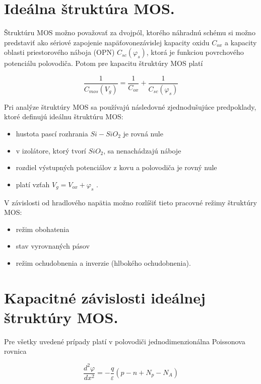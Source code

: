\section{Ideálna štruktúra MOS.}  

Štruktúru MOS možno považovať za dvojpól, ktorého náhradnú schému si
možno predstaviť ako sériové zapojenie napäťovonezávislej kapacity
oxidu $C_{ox}$ a kapacity oblasti priestorového náboja (OPN)
$C_{sc}(\varphi_{s})$, ktorá je funkciou povrchového potenciálu
polovodiča. Potom pre kapacitu štruktúry MOS platí \cite{I.1}

\begin{equation}\label{eq:1.1}
\frac{1}{C_{mos}(V_g)} = \frac{1}{C_{ox}} + \frac{1}{C_{sc}(\varphi_s)}
\end{equation}

Pri analýze štruktúry MOS sa používajú následovné zjednodušujúce
predpoklady, ktoré definujú ideálnu štruktúru MOS:

\begin{itemize}
\item hustota pascí rozhrania $Si-SiO_2$ je rovná nule 
\item v izolátore, ktorý tvorí $SiO_2$, sa nenachádzajú náboje 
\item rozdiel výstupných potenciálov z kovu a polovodiča je rovný nule
\item platí vzťah $V_{g}=V_{ox}+\varphi_{s}$  .
\end{itemize}

\noindent V závislosti od hradlového napätia možno rozlíšiť tieto
pracovné režimy štruktúry MOS:

\begin{itemize}
\item režim obohatenia
\item stav vyrovnaných pásov
\item režim ochudobnenia a inverzie (hlbokého ochudobnenia).
\end{itemize}

\section{Kapacitné závislosti ideálnej štruktúry MOS.}

Pre všetky uvedené prípady platí v polovodiči jednodimenzionálna
Poissonova rovnica

\begin{equation}\label{eq:1.2}
\frac{d^2\varphi}{dx^2}=-\frac{q}{\varepsilon}(p-n+N_{p}-N_{A})
\end{equation}

